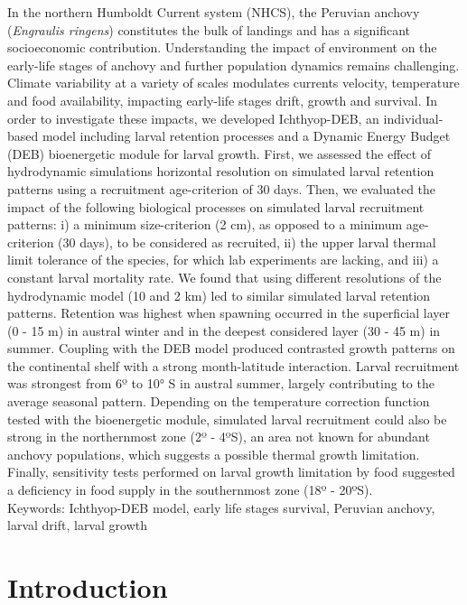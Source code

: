 In the northern Humboldt Current system (NHCS), the Peruvian anchovy (\textit{Engraulis ringens}) constitutes the bulk of landings and has a significant socioeconomic contribution. Understanding the impact of environment on the early-life stages of anchovy and further population dynamics remains challenging. Climate variability at a variety of scales modulates currents velocity, temperature and food availability, impacting early-life stages drift, growth and survival. In order to investigate these impacts, we developed Ichthyop-DEB, an individual-based model including larval retention processes and a Dynamic Energy Budget (DEB) bioenergetic module for larval growth. First, we assessed the effect of hydrodynamic simulations horizontal resolution on simulated larval retention patterns using a recruitment age-criterion of 30 days. Then, we evaluated the impact of the following biological processes on simulated larval recruitment patterns: i) a minimum size-criterion (2 cm), as opposed to a minimum age-criterion (30 days), to be considered as recruited, ii) the upper larval thermal limit tolerance of the species, for which lab experiments are lacking, and iii) a constant larval mortality rate. We found that using different resolutions of the hydrodynamic model (10 and 2 km) led to similar simulated larval retention patterns. Retention was highest when spawning occurred in the superficial layer (0 - 15 m) in austral winter and in the deepest considered layer (30 - 45 m) in summer. Coupling with the DEB model produced contrasted growth patterns on the continental shelf with a strong month-latitude interaction. Larval recruitment was strongest from 6º to 10° S in austral summer, largely contributing to the average seasonal pattern. Depending on the temperature correction function tested with the bioenergetic module, simulated larval recruitment could also be strong in the northernmost zone (2º - 4ºS), an area not known for abundant anchovy populations, which suggests a possible thermal growth limitation. Finally, sensitivity tests performed on larval growth limitation by food suggested a deficiency in food supply in the southernmost zone (18º - 20ºS).\\

Keywords: Ichthyop-DEB model, early life stages survival, Peruvian anchovy, larval drift, larval growth

\section{Introduction}\label{Chap3Intro}

